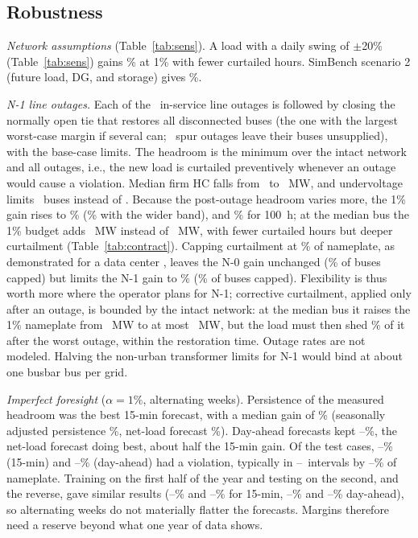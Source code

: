 \documentclass[conference,letterpaper]{IEEEtran}
\begin{document}
\subsection{Robustness}\label{sec:sens}
\emph{Network assumptions} (Table~\ref{tab:sens}). A load with a daily swing of $\pm$20\% (Table~\ref{tab:sens}) gains \shpRowGone\% at 1\% with fewer curtailed hours. SimBench scenario 2 (future load, DG, and storage) gives \sensStwogO\%.

\emph{N-1 line outages.} Each of the \nmoN~in-service line outages is followed by closing the normally open tie that restores all disconnected buses (the one with the largest worst-case margin if several can; \nmoUnr~spur outages leave their buses unsupplied), with the base-case limits. The headroom is the minimum over the intact network and all outages, i.e., the new load is curtailed preventively whenever an outage would cause a violation. Median firm HC falls from \sensBasefirm~to \sensNmofirm~MW, and undervoltage limits \sensNmonv~buses instead of \sensBasenv. Because the post-outage headroom varies more, the 1\% gain rises to \sensNmogO\% (\sensNmowgO\% with the wider band), and \sensNmohOZZ\% for 100~h; at the median bus the 1\% budget adds \ctNadd~MW instead of \ctBadd~MW, with fewer curtailed hours but deeper curtailment (Table~\ref{tab:contract}). Capping curtailment at \depCap\% of nameplate, as demonstrated for a data center \cite{colangelo2025}, leaves the N-0 gain unchanged (\depNZshare\% of buses capped) but limits the N-1 gain to \depNOgain\% (\depNOshare\% of buses capped). Flexibility is thus worth more where the operator plans for N-1; corrective curtailment, applied only after an outage, is bounded by the intact network: at the median bus it raises the 1\% nameplate from \corPreMW~MW to at most \corCorMW~MW, but the load must then shed \corDepth\% of it after the worst outage, within the restoration time. Outage rates are not modeled. Halving the non-urban transformer limits for N-1 would bind at about one busbar bus per grid.



\emph{Imperfect foresight} ($\alpha=1\%$, alternating weeks). Persistence of the measured headroom was the best 15-min forecast, with a median gain of \fcPFifteengain\% (seasonally adjusted persistence \fcSAFifteengain\%, net-load forecast \fcNLFifteengain\%). Day-ahead forecasts kept \fcRangeDagainLo--\fcRangeDagainHi\%, the net-load forecast doing best, about half the 15-min gain. Of the test cases, \fcRangeFifteenviolLo--\fcRangeFifteenviolHi\% (15-min) and \fcRangeDaviolLo--\fcRangeDaviolHi\% (day-ahead) had a violation, typically in \fcVintLo--\fcVintHi~intervals by \fcExcLo--\fcExcHi\% of nameplate. Training on the first half of the year and testing on the second, and the reverse, gave similar results (\fcBlkFifteengainLo--\fcBlkFifteengainHi\% and \fcBlkFifteenviolLo--\fcBlkFifteenviolHi\% for 15-min, \fcBlkDagainLo--\fcBlkDagainHi\% and \fcBlkDaviolLo--\fcBlkDaviolHi\% day-ahead), so alternating weeks do not materially flatter the forecasts. Margins therefore need a reserve beyond what one year of data shows.
\end{document}
